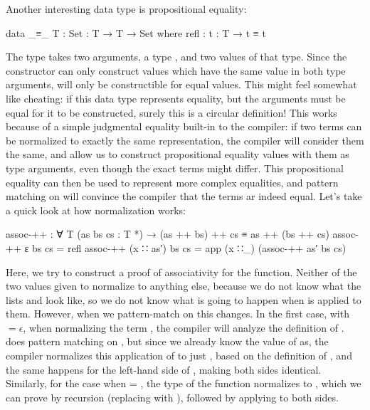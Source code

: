 		Another interesting data type is propositional equality:

		\begin{code}
			data _≡_ {T : Set} : T → T → Set where
			  refl : {t : T} → t ≡ t
		\end{code}

		The type  takes two arguments, a type , and two
		values of that type. Since the constructor can only construct values
		which have the same value in both type arguments,  will
		only be constructible for equal values. This might feel somewhat like
		cheating: if this data type represents equality, but the arguments must
		be equal for it to be constructed, surely this is a circular
		definition! This works because of a simple judgmental equality built-in
		to the compiler: if two terms can be normalized to exactly the same
		representation, the compiler will consider them the same, and allow us
		to construct propositional equality values with them as type arguments,
		even though the exact terms might differ. This propositional equality
		can then be used to represent more complex equalities, and pattern
		matching on  will convince the compiler that the terms ar
		indeed equal. Let's take a quick look at how normalization works:

		\begin{code}
			assoc-++ : ∀ {T} (as bs cs : T *) → (as ++ bs) ++ cs ≡ as ++ (bs ++ cs)
			assoc-++ ε          bs cs = refl
			assoc-++ (x ∷ as′)  bs cs = app (x ∷_) (assoc-++ as′ bs cs)
		\end{code}

	 	Here, we try to construct a proof of associativity for the
	 	\codett{\_++\_} function. Neither of the two values given to
	 	 normalize to anything else, because we do not know what
	 	the lists  and  look like, so we do not know
	 	what is going to happen when \codett{\_++\_} is applied to them.
	 	However, when we pattern-match on  this changes. In the
	 	first case, with  $=\epsilon$, when normalizing the term
	 	, the compiler will analyze the definition of
	 	\codett{\_++\_}. \codett{\_++\_} does pattern matching on ,
	 	but since we already know the value of as, the compiler normalizes this
	 	application of \codett{\_++\_} to just , based on the
	 	definition of \codett{\_++\_}, and the same happens for the left-hand
	 	side of , making both sides identical.  Similarly, for
	 	the case when  = , the type of the function
	 	normalizes to , which we can prove by recursion (replacing  with
	 	), followed by applying  to both sides.
